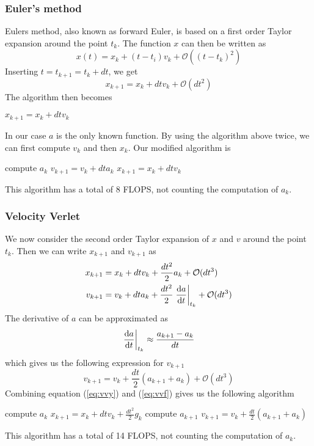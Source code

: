 \subsubsection{Euler's method}
\label{sec:fe}
Eulers method, also known as forward Euler, is based on a first order Taylor expansion around the point $t_k$. The function $x$ can then be written as
\begin{equation}
	x(t) = x_k + (t-t_i)v_k+\mathcal{O}\left(\left( t-t_k\right) ^2\right)
\end{equation}
Inserting $t=t_{k+1} = t_k + dt$, we get
\begin{equation}
	x_{k+1}=x_k + dtv_k + \mathcal{O}\left( dt^2\right)
\end{equation}
The algorithm then becomes
\begin{algorithm}[h!]
	\SetAlgoLined
		$x_{k+1} = x_k+dtv_k$\;
\end{algorithm}

In our case $a$ is the only known function. By using the algorithm above twice, we can first compute $v_k$ and then $x_k$. Our modified algorithm is
\begin{algorithm}[h!]
	\SetAlgoLined
		compute $a_k$\;
		$v_{k+1} = v_k+dta_k$\;
		$x_{k+1} = x_k+dtv_k$\;
\end{algorithm}
This algorithm has a total of 8 FLOPS, not counting the computation of $a_k$.

\subsubsection{Velocity Verlet}
\label{sec:vv}
We now consider the second order Taylor expansion of $x$ and $v$ around the point $t_k$. Then we can write $x_{k+1}$ and $v_{k+1}$ as
\begin{align} \label{eq:vvy}
	x_{k+1}&=x_k + dtv_k + \frac{dt^2}{2}a_k  +\mathcal{O}(dt^3) \\
	v_{k+1}&=v_k + dta_k + \frac{dt^2}{2}\left.\dv{a}{t}\right\rvert_{t_k}  +\mathcal{O}(dt^3)
\end{align}
The derivative of $a$ can be approximated as
\begin{equation}
	 \left.\dv{a}{t}\right\rvert_{t_k} \approx \frac{a_{k+1}-a_k}{dt}
\end{equation}
which gives us the following expression for $v_{k+1}$
\begin{equation}\label{eq:vvf}
	v_{k+1}=v_k + \frac{dt}{2}\left(a_{k+1} + a_k \right)  +\mathcal{O}(dt^3)
\end{equation}
Combining equation (\ref{eq:vvy}) and (\ref{eq:vvf}) gives us the following algorithm
\begin{algorithm}[h!]
	\SetAlgoLined
		compute $a_k$\;
		$x_{k+1} = x_k+dtv_k+\frac{dt^2}{2}g_k$\;
		compute $a_{k+1}$\;
		$v_{k+1} = v_k + \frac{dt}{2}\left(a_{k+1}+a_k\right)$\;
\end{algorithm}
This algorithm has a total of 14 FLOPS, not counting the computation of $a_k$. 

